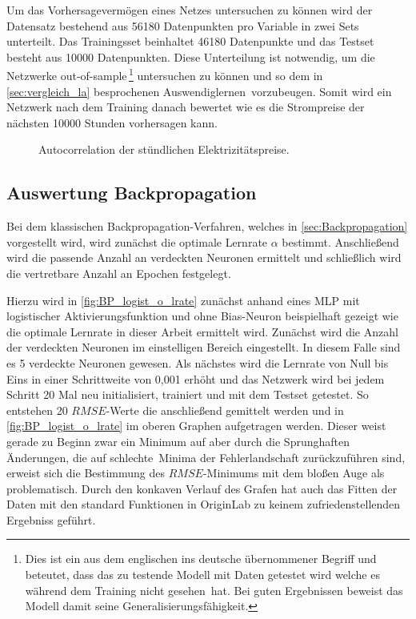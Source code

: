 Um das Vorhersagevermögen eines Netzes untersuchen zu können wird der Datensatz bestehend aus 56180 Datenpunkten pro Variable in zwei Sets unterteilt. Das Trainingsset beinhaltet 46180 Datenpunkte und das Testset besteht aus 10000 Datenpunkten. Diese Unterteilung ist notwendig, um die Netzwerke out-of-sample\,\footnote{Dies ist ein aus dem englischen ins deutsche übernommener Begriff und beteutet, dass das zu testende Modell mit Daten getestet wird welche es während dem Training nicht \glqq gesehen\grqq~hat. Bei guten Ergebnissen beweist das Modell damit seine Generalisierungsfähigkeit.} untersuchen zu können und so dem in \autoref{sec:vergleich_la} besprochenen \glqq Auswendiglernen\grqq~vorzubeugen. Somit wird ein Netzwerk nach dem Training danach bewertet wie es die Strompreise der nächsten 10000 Stunden vorhersagen kann.

\begin{figure}[!htb]
    \centering
        
    \caption{Autocorrelation der stündlichen Elektrizitätspreise.}
    \label{fig:autocorrelation}
\end{figure}


\subsection{Auswertung Backpropagation}\label{sec:aus_backprop}

Bei dem klassischen Backpropagation-Verfahren, welches in \autoref{sec:Backpropagation} vorgestellt wird, wird zunächst die optimale Lernrate $\alpha$ bestimmt. Anschließend wird die passende Anzahl an verdeckten Neuronen ermittelt und schließlich wird die vertretbare Anzahl an Epochen festgelegt.

Hierzu wird in \autoref{fig:BP_logist_o_lrate} zunächst anhand eines MLP mit logistischer Aktivierungsfunktion und ohne Bias-Neuron beispielhaft gezeigt wie die optimale Lernrate in dieser Arbeit ermittelt wird. Zunächst wird die Anzahl der verdeckten Neuronen im einstelligen Bereich eingestellt. In diesem Falle sind es 5 verdeckte Neuronen gewesen. Als nächstes wird die Lernrate von Null bis Eins in einer Schrittweite von 0,001 erhöht und das Netzwerk wird bei jedem Schritt 20 Mal neu initialisiert, trainiert und mit dem Testset getestet. So entstehen 20 $RMSE$-Werte die anschließend gemittelt werden und in \autoref{fig:BP_logist_o_lrate} im oberen Graphen aufgetragen werden. Dieser weist gerade zu Beginn zwar ein Minimum auf aber durch die Sprunghaften Änderungen, die auf \glqq schlechte\grqq~Minima der Fehlerlandschaft zurückzuführen sind, erweist sich die Bestimmung des $RMSE$-Minimums mit dem bloßen Auge als problematisch. Durch den konkaven Verlauf des Grafen hat auch das Fitten der Daten mit den standard Funktionen in OriginLab zu keinem zufriedenstellenden Ergebniss geführt.

